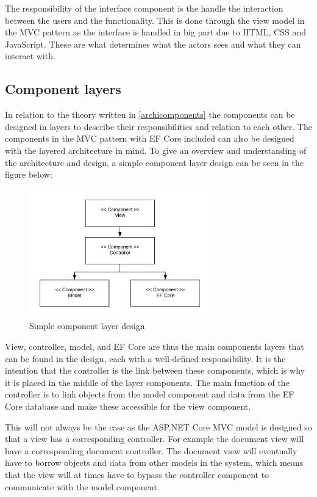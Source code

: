 The responsibility of the interface component is the handle the interaction between the users and the functionality.
This is done through the view model in the MVC pattern as the interface is handled in big part due to HTML, CSS and JavaScript.
These are what determines what the actors sees and what they can interact with.

\subsection{Component layers}
In relation to the theory written in \cref{archicomponents} the components can be designed in layers to describe their responsibilities and relation to each other.
The components in the MVC pattern with EF Core included can also be designed with the layered architecture in mind.
To give an overview and understanding of the architecture and design, a simple component layer design can be seen in the figure below:

\begin{figure}[H]
	\centering
	\includegraphics[width=0.7\textwidth]{billeder/simplecomponents.jpeg}
	\caption{Simple component layer design}\label{fig:SimpleComponent}
\end{figure}

View, controller, model, and EF Core are thus the main components layers that can be found in the design, each with a well-defined responsibility.
It is the intention that the controller is the link between these components, which is why it is placed in the middle of the layer components.
The main function of the controller is to link objects from the model component and data from the EF Core database and make these accessible for the view component.

This will not always be the case as the ASP.NET Core MVC model is designed so that a view has a corresponding controller.
For example the document view will have a corresponding document controller.
The document view will eventually have to borrow objects and data from other models in the system, which means that the view will at times have to bypass the controller component to communicate with the model component.

